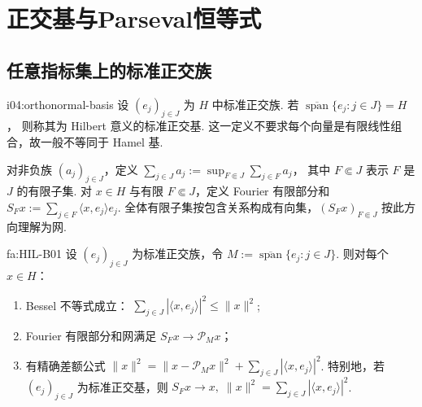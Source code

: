 \section{正交基与Parseval恒等式}\label{sec:i04-orthonormal-bases}

\subsection{任意指标集上的标准正交族}

\begin{FADefinition}[B][Hilbert标准正交基与任意指标求和]{i04:orthonormal-basis}
设 \(\displaystyle (e_j)_{j\in J}\) 为 \(\displaystyle H\) 中标准正交族. 若 \(\displaystyle \overline{\operatorname{span}}\{e_j:j\in J\}=H\)，
则称其为 Hilbert 意义的标准正交基. 这一定义不要求每个向量是有限线性组合，故一般不等同于 Hamel 基.

对非负族 \(\displaystyle (a_j)_{j\in J}\)，定义 \(\displaystyle \sum_{j\in J}a_j :=\sup_{F\Subset J}\sum_{j\in F}a_j\)，
其中 \(\displaystyle F\Subset J\) 表示 \(\displaystyle F\) 是 \(\displaystyle J\) 的有限子集. 对 \(\displaystyle x\in H\) 与有限 \(\displaystyle F\Subset J\)，定义 Fourier 有限部分和 \(\displaystyle S_Fx:=\sum_{j\in F}\langle x,e_j\rangle e_j\).
全体有限子集按包含关系构成有向集，\(\displaystyle (S_Fx)_{F\Subset J}\) 按此方向理解为网.
\end{FADefinition}

\begin{FATheorem}[B][Bessel不等式与Parseval]{fa:HIL-B01}
设 \(\displaystyle (e_j)_{j\in J}\) 为标准正交族，令 \(\displaystyle M:=\overline{\operatorname{span}}\{e_j:j\in J\}\).
则对每个 \(\displaystyle x\in H\)：
\begin{enumerate}[label=\textnormal{(\roman*)}]
\item Bessel 不等式成立： \(\displaystyle \sum_{j\in J}|\langle x,e_j\rangle|^2\leqslant\|x\|^2\);
\item Fourier 有限部分和网满足 \(\displaystyle S_Fx\to\mathcal P_Mx\)；
\item 有精确差额公式 \(\displaystyle \|x\|^2 =\|x-\mathcal P_Mx\|^2 +\sum_{j\in J}|\langle x,e_j\rangle|^2\).
特别地，若 \(\displaystyle (e_j)_{j\in J}\) 为标准正交基，则 \(\displaystyle S_Fx\to x, \; \|x\|^2=\sum_{j\in J}|\langle x,e_j\rangle|^2\).
\end{enumerate}
\end{FATheorem}

